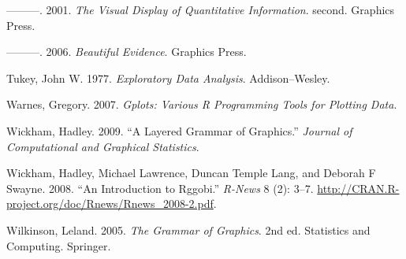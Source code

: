 ---------. 2001. \emph{The Visual Display of Quantitative Information}.
second. Graphics Press.

---------. 2006. \emph{Beautiful Evidence}. Graphics Press.

Tukey, John W. 1977. \emph{Exploratory Data Analysis}. Addison--Wesley.

Warnes, Gregory. 2007. \emph{Gplots: Various R Programming Tools for
Plotting Data}.

Wickham, Hadley. 2009. ``A Layered Grammar of Graphics.'' \emph{Journal
of Computational and Graphical Statistics}.

Wickham, Hadley, Michael Lawrence, Duncan {Temple Lang}, and Deborah F
Swayne. 2008. ``An Introduction to Rggobi.'' \emph{R-News} 8 (2): 3--7.
\url{http://CRAN.R-project.org/doc/Rnews/Rnews_2008-2.pdf}.

Wilkinson, Leland. 2005. \emph{The Grammar of Graphics}. 2nd ed.
Statistics and Computing. Springer.
